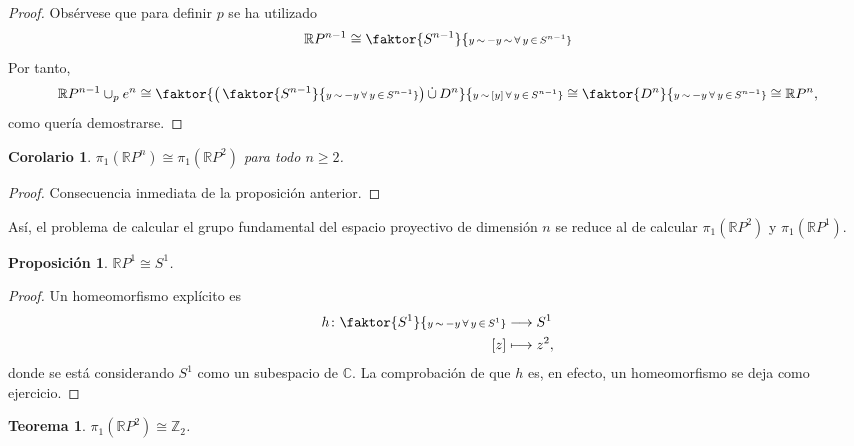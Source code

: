 \documentclass[11pt]{report}
\newenvironment{ctheorem} %
  {\begin{mdframed}[innertopmargin = 0pt,
                    innerbottommargin = 7.5pt,
                    backgroundcolor = lightgray!10,
                    linewidth = 1pt,
                    shadow = true,
                    shadowsize = 5pt,
                    roundcorner = 0pt,
                    skipabove = 0pt]
    \begin{theorem}}
  {\end{theorem}\end{mdframed}}
\newtheorem{proposition}{Proposición}[chapter]
\newtheorem{corollary}{Corolario}[chapter]
\newtheorem{theorem}{Teorema}[chapter]
\theoremstyle{definition}
\theoremstyle{definition}
\theoremstyle{remark}
\newcommand{\R}{\mathbb R}
\newcommand{\Z}{\mathbb Z}
\newcommand{\C}{\mathbb C}
\begin{document}
\begin{proof}
Obsérvese que para definir $p$ se ha utilizado
\[\R P^{n-1} \cong \faktor{S^{n-1}}{\scriptstyle{y \, \sim \, -y \, \sim \, \forall \, y \, \in \, S^{n-1} }}\]
Por tanto,
\[\R P^{n-1} \cup_p e^n \cong \faktor{\bigl( \, \faktor{S^{n-1}}{\scriptstyle{y \, \sim \, -y \, \forall \, y \, \in \, S^{n-1}}}\bigr) \,\dot\cup \, D^n}{\scriptstyle{y \, \sim \, [y] \, \forall \, y \, \in \, S^{n-1}}} \cong \faktor{D^n}{\scriptstyle{y \, \sim \, -y \, \forall \, y \, \in \, S^{n-1}}} \cong \R P^n,\]
como quería demostrarse.
\end{proof}

\begin{corollary}
$\pi_1(\R P^n) \cong \pi_1(\R P^2)$ para todo $n \geq 2$.
\end{corollary}

\begin{proof}
Consecuencia inmediata de la proposición anterior.
\end{proof}

Así, el problema de calcular el grupo fundamental del espacio proyectivo de dimensión $n$ se reduce al de calcular $\pi_1(\R P^2)$ y $\pi_1(\R P^1)$.

\begin{proposition}
$\R P^1 \cong S^1$.
\end{proposition}

\begin{proof}
Un homeomorfismo explícito es
\[\begin{aligned}[t]
    h \colon \faktor{S^1}{\scriptstyle{y \, \sim \, -y \, \forall \, y \, \in \, S^1}} &\longrightarrow S^1 \\
    [z] &\longmapsto z^2,
\end{aligned}\]
donde se está considerando $S^1$ como un subespacio de $\C$. La comprobación de que $h$ es, en efecto, un homeomorfismo se deja como ejercicio.
\end{proof}

\begin{ctheorem}
$\pi_1(\R P^2) \cong \Z_2$.
\end{ctheorem}
\end{document}
